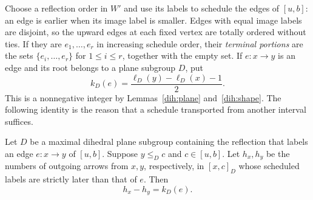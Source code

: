 Choose a reflection order in $W'$ and use its labels to schedule
the edges of $[u,b]$: an edge is earlier when its image label is
smaller. Edges with equal image labels are disjoint, so the upward
edges at each fixed vertex are totally ordered without ties.
If they are $e_1,\ldots,e_r$ in increasing schedule order, their
\emph{terminal portions} are the sets $\{e_i,\ldots,e_r\}$
for $1\le i\le r$, together with the empty set. If
$e:x\to y$ is an edge and its root belongs to a plane subgroup
$D$, put
\[
 k_D(e)=\frac{\ell_D(y)-\ell_D(x)-1}{2}.
\]
This is a nonnegative integer by Lemmas~\ref{dih:plane} and~\ref{dih:shape}. The
following identity is the reason that a schedule transported
from another interval suffices.

\begin{lemma}\label{dih:count}
Let $D$ be a maximal dihedral plane subgroup containing the reflection
that labels an edge $e:x\to y$ of $[u,b]$.
Suppose $y\le_D c$ and $c\in[u,b]$. Let $h_x,h_y$ be the numbers
of outgoing arrows from $x,y$, respectively, in $[x,c]_D$ whose
scheduled labels are strictly later than that of $e$.  Then
\begin{equation}\label{eq:count}
 h_x-h_y=k_D(e).
\end{equation}
\end{lemma}

